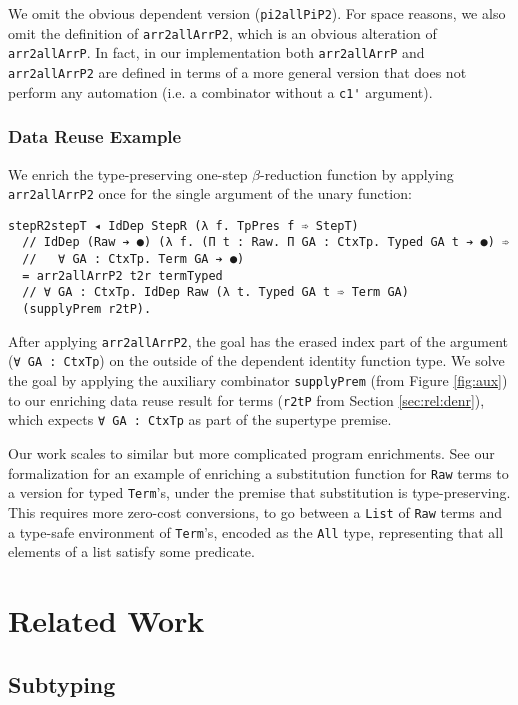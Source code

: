 \documentclass[acmsmall]{acmart}\settopmatter{}
\newcommand{\refsec}[1]{Section \ref{sec:#1}}
\newcommand{\labsec}[1]{\label{sec:#1}}
\newcommand{\reffig}[1]{Figure \ref{fig:#1}}
\begin{document}
We omit the obvious dependent version (\verb;pi2allPiP2;). For space
reasons, we also omit the definition of \verb;arr2allArrP2;, which is
an obvious alteration of \verb;arr2allArrP;. In fact, in our
implementation both \verb;arr2allArrP; and \verb;arr2allArrP2; are
defined in terms of a more general version that does not perform any
automation (i.e. a combinator without a \verb;c1'; argument).

\subsubsection{Data Reuse Example}

We enrich the type-preserving one-step $\beta$-reduction function
by applying \verb;arr2allArrP2; once for the single
argument of the unary function:
\begin{verbatim}
stepR2stepT ◂ IdDep StepR (λ f. TpPres f ➾ StepT)
  // IdDep (Raw ➔ ●) (λ f. (Π t : Raw. Π GA : CtxTp. Typed GA t ➔ ●) ➾
  //   ∀ GA : CtxTp. Term GA ➔ ●)
  = arr2allArrP2 t2r termTyped
  // ∀ GA : CtxTp. IdDep Raw (λ t. Typed GA t ➾ Term GA)
  (supplyPrem r2tP).
\end{verbatim}
After applying \verb;arr2allArrP2;, the goal has the erased index part
of the argument (\verb;∀ GA : CtxTp;) on the outside of the dependent
identity function type. We solve the goal by applying the auxiliary
combinator \verb;supplyPrem; (from \reffig{aux}) to our enriching
data reuse result for terms (\verb;r2tP; from \refsec{rel:denr}),
which expects \verb;∀ GA : CtxTp; as part of the supertype premise.

Our work scales to similar but more complicated program
enrichments. See our formalization for an example of enriching a
substitution function for \verb;Raw; terms to a version for typed \verb;Term;'s,
under the premise that substitution is type-preserving. This
requires more zero-cost conversions, to go between a \verb;List; of
\verb;Raw; terms and a type-safe environment of \verb;Term;'s,
encoded as the \verb;All; type, representing that all elements of a
list satisfy some predicate.

\section{Related Work}
\labsec{others}

\subsection{Subtyping}
\labsec{others:judg}
\end{document}
